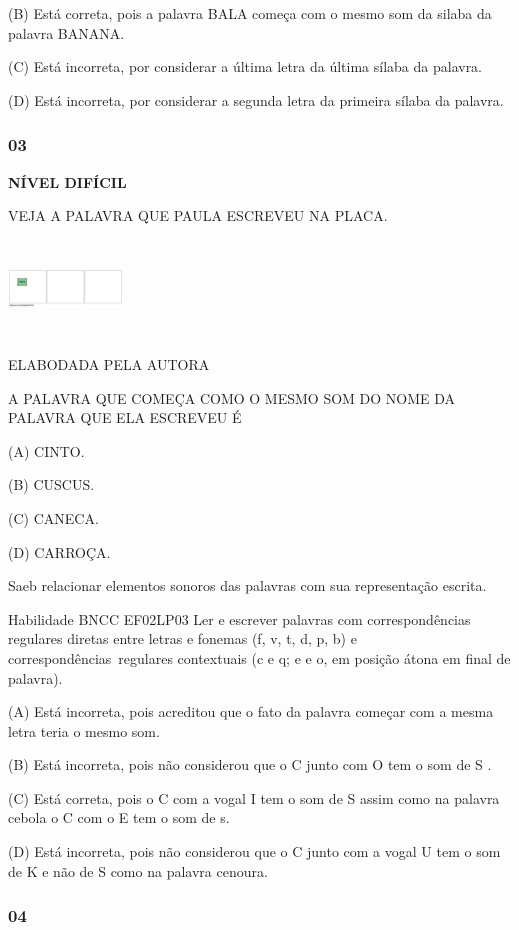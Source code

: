 (B) Está correta, pois a palavra BALA começa com o mesmo som da silaba
da palavra BANANA.

(C) Está incorreta, por considerar a última letra da última sílaba da
palavra.

(D) Está incorreta, por considerar a segunda letra da primeira sílaba da
palavra.

\subsubsection{03}\label{section-145}

\textbf{NÍVEL DIFÍCIL}

VEJA A PALAVRA QUE PAULA ESCREVEU NA PLACA.

\includegraphics[width=1.19861in,height=1.00625in]{media/image176.png}

ELABODADA PELA AUTORA

A PALAVRA QUE COMEÇA COMO O MESMO SOM DO NOME DA PALAVRA QUE ELA
ESCREVEU É

(A) CINTO.

(B) CUSCUS.

(C) CANECA.

(D) CARROÇA.

Saeb relacionar elementos sonoros das palavras com sua representação
escrita.

Habilidade BNCC EF02LP03 Ler e escrever palavras com correspondências
regulares diretas entre letras e fonemas (f, v, t, d, p, b) e
correspondências~regulares contextuais (c e q; e e o, em posição átona
em final de palavra).

(A) Está incorreta, pois acreditou que o fato da palavra começar com a
mesma letra teria o mesmo som.

(B) Está incorreta, pois não considerou que o C junto com O tem o som de
S .

(C) Está correta, pois o C com a vogal I tem o som de S assim como na
palavra cebola o C com o E tem o som de s.

(D) Está incorreta, pois não considerou que o C junto com a vogal U tem
o som de K e não de S como na palavra cenoura.

\subsubsection{04 }\label{section-146}

